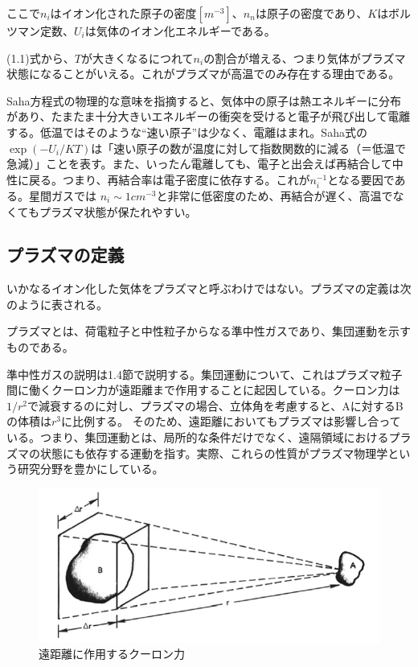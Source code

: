 \documentclass{ltjsarticle}
\numberwithin{equation}{section} %
\begin{document}
ここで$n_i$はイオン化された原子の密度$[m^{-3}]$、$n_n$は原子の密度であり、$K$はボルツマン定数、$U_i$は気体のイオン化エネルギーである。

(1.1)式から、$T$が大きくなるにつれて$n_i$の割合が増える、つまり気体がプラズマ状態になることがいえる。これがプラズマが高温でのみ存在する理由である。

Saha方程式の物理的な意味を指摘すると、気体中の原子は熱エネルギーに分布があり、たまたま十分大きいエネルギーの衝突を受けると電子が飛び出して電離する。低温ではそのような“速い原子”は少なく、電離はまれ。Saha式の 
$\exp{(-U_i/KT)}$は「速い原子の数が温度に対して指数関数的に減る（＝低温で急減）」ことを表す。また、いったん電離しても、電子と出会えば再結合して中性に戻る。つまり、再結合率は電子密度に依存する。これが$n_i ^{-1}$となる要因である。星間ガスでは 
$n_i \sim 1 cm^{-3}$と非常に低密度のため、再結合が遅く、高温でなくてもプラズマ状態が保たれやすい。


\subsection{プラズマの定義}
いかなるイオン化した気体をプラズマと呼ぶわけではない。プラズマの定義は次のように表される。
\begin{center}
プラズマとは、荷電粒子と中性粒子からなる準中性ガスであり、集団運動を示すものである。  
\end{center}

準中性ガスの説明は1.4節で説明する。集団運動について、これはプラズマ粒子間に働くクーロン力が遠距離まで作用することに起因している。クーロン力は$1/r^2$で減衰するのに対し、プラズマの場合、立体角を考慮すると、Aに対するBの体積は$r^3$に比例する。
そのため、遠距離においてもプラズマは影響し合っている。つまり、集団運動とは、局所的な条件だけでなく、遠隔領域におけるプラズマの状態にも依存する運動を指す。実際、これらの性質がプラズマ物理学という研究分野を豊かにしている。

\begin{figure}[htbp]
  \centering
  \includegraphics[width=0.7\linewidth]{solid_angle.png}
  \caption{遠距離に作用するクーロン力}
  \label{fig:sample}
\end{figure}
\end{document}
